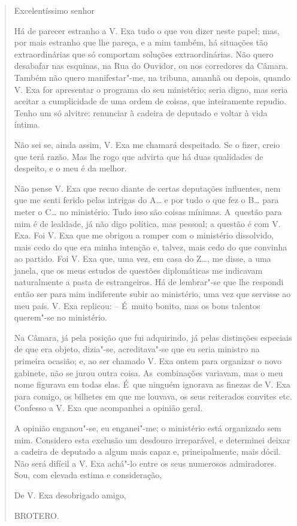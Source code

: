 \begin{quote}
Excelentíssimo senhor

Há de parecer estranho a V. Exa tudo o que vou dizer neste papel; mas,
por mais estranho que lhe pareça, e a mim também, há situações tão
extraordinárias que só comportam soluções extraordinárias. Não quero
desabafar nas esquinas, na Rua do Ouvidor, ou nos corredores da Câmara.
Também não quero manifestar"-me, na tribuna, amanhã ou depois, quando V.
Exa for apresentar o programa do seu ministério; seria digno, mas seria
aceitar a cumplicidade de uma ordem de coisas, que inteiramente repudio.
Tenho um só alvitre: renunciar à cadeira de deputado e voltar à vida
íntima.

Não sei se, ainda assim, V. Exa me chamará despeitado. Se o fizer, creio
que terá razão. Mas lhe rogo que advirta que há duas qualidades de
despeito, e o meu é da melhor.

Não pense V. Exa que recuo diante de certas deputações influentes, nem
que me senti ferido pelas intrigas do A\ldots{} e por tudo o que fez o B\ldots{}
para meter o C\ldots{} no ministério. Tudo isso são coisas mínimas. A~questão
para mim é de lealdade, já não digo política, mas pessoal; a questão é
com V. Exa. Foi V. Exa que me obrigou a romper com o ministério
dissolvido, mais cedo do que era minha intenção e, talvez, mais cedo do
que convinha ao partido. Foi V. Exa que, uma vez, em casa do Z\ldots{}, me
disse, a uma janela, que os meus estudos de questões diplomáticas me
indicavam naturalmente a pasta de estrangeiros. Há de lembrar"-se que lhe
respondi então ser para mim indiferente subir ao ministério, uma vez que
servisse ao meu país. V. Exa replicou: -- É~muito bonito, mas os bons
talentos querem"-se no ministério.

Na Câmara, já pela posição que fui adquirindo, já pelas distinções
especiais de que era objeto, dizia"-se, acreditava"-se que eu seria
ministro na primeira ocasião; e, ao ser chamado V. Exa ontem para
organizar o novo gabinete, não se jurou outra coisa. As~combinações
variavam, mas o meu nome figurava em todas elas. É~que ninguém ignorava
as finezas de V. Exa para comigo, os bilhetes em que me louvava, os seus
reiterados convites etc. Confesso a V. Exa que acompanhei a opinião
geral.

A opinião enganou"-se, eu enganei"-me; o ministério está organizado sem
mim. Considero esta exclusão um desdouro irreparável, e determinei
deixar a cadeira de deputado a algum mais capaz e, principalmente, mais
dócil. Não será difícil a V. Exa achá"-lo entre os seus numerosos
admiradores. Sou, com elevada estima e consideração,

De V. Exa desobrigado amigo,

BROTERO.
\end{quote}

